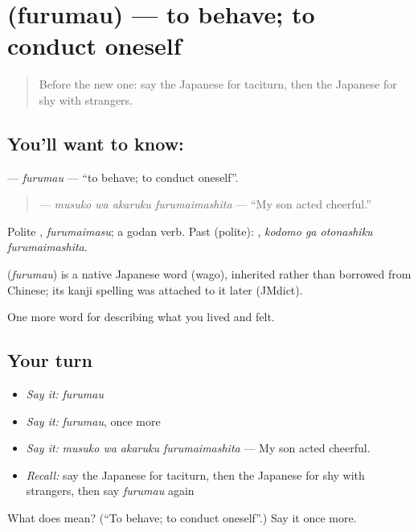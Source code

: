 \section[\texorpdfstring{\ja{ふるまう} (furumau)}{ふるまう (furumau)}]{ (furumau) — to behave; to conduct oneself}

\label{lesson:JA-C436-furumau}



\begin{quote}
Before the new one: say the Japanese for taciturn, then the Japanese for shy with strangers.
\end{quote}

\subsection*{You'll want to know: }
\textbf{} — \emph{furumau} — \textquotedblleft{}to behave; to conduct oneself\textquotedblright{}.

\begin{quote}
\textbf{  } — \emph{musuko wa akaruku furumaimashita} — \textquotedblleft{}My son acted cheerful.\textquotedblright{}
\end{quote}

Polite \textbf{}, \emph{furumaimasu}; a godan verb. Past (polite): \textbf{  }, \emph{kodomo ga otonashiku furumaimashita}.

\begin{cousinweb}
\textbf{} (\emph{furumau}) is a native Japanese word (wago), inherited rather than borrowed from Chinese; its kanji spelling was attached to it later (JMdict).
\end{cousinweb}

\begin{grammarlens}[title={What you've built}]
One more word for describing what you lived and felt.
\end{grammarlens}

\subsection*{Your turn}
\begin{itemize}
\raggedright
  \item \emph{Say it:} \emph{furumau}
  \item \emph{Say it:} \emph{furumau}, once more
  \item \emph{Say it:} \emph{musuko wa akaruku furumaimashita} — My son acted cheerful.
  \item \emph{Recall:} say the Japanese for taciturn, then the Japanese for shy with strangers, then say \emph{furumau} again
\end{itemize}

\begin{tcolorbox}[breakable,colback=teal!4,colframe=teal!35!black,title={Before you move on}]
What does  mean? (\textquotedblleft{}To behave; to conduct oneself\textquotedblright{}.) Say it once more.
\end{tcolorbox}
